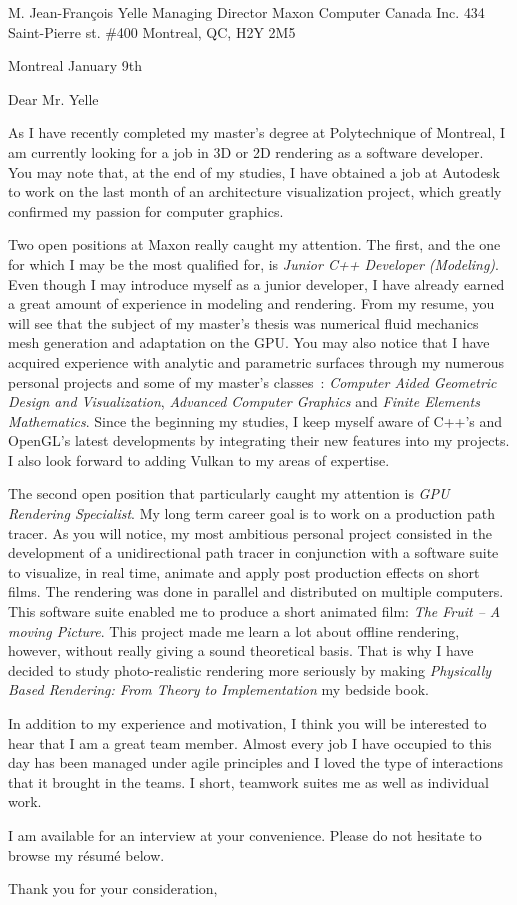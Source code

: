 \insertcvheader

\clrecipient
 {M. Jean-François Yelle}
 {Managing Director}
 {Maxon Computer Canada Inc.}
 {434 Saint-Pierre st. \#400}
 {Montreal, QC, H2Y 2M5}
 
\cllocationdate
 {Montreal}
 {January 9th}
 
\clgreeting
 {Dear Mr. Yelle}
 
As I have recently completed my master's degree at Polytechnique of Montreal, I am currently looking for a job in 3D or 2D rendering as a software developer. You may note that, at the end of my studies, I have obtained a job at Autodesk to work on the last month of an architecture visualization project, which greatly confirmed my passion for computer graphics.

Two open positions at Maxon really caught my attention. The first, and the one for which I may be the most qualified for, is \textit{Junior C++ Developer (Modeling)}. Even though I may introduce myself as a junior developer, I have already earned a great amount of experience in modeling and rendering. From my resume, you will see that the subject of my master's thesis was numerical fluid mechanics mesh generation and adaptation on the GPU. You may also notice that I have acquired experience with analytic and parametric surfaces through my numerous personal projects and some of my master's classes~: \textit{Computer Aided Geometric Design and Visualization}, \textit{Advanced Computer Graphics} and \textit{Finite Elements Mathematics}. Since the beginning my studies, I keep myself aware of C++'s and OpenGL's latest developments by integrating their new features into my projects. I also look forward to adding Vulkan to my areas of expertise. 

The second open position that particularly caught my attention is \textit{GPU Rendering Specialist}. My long term career goal is to work on a production path tracer. As you will notice, my most ambitious personal project consisted in the development of a unidirectional path tracer in conjunction with a software suite to visualize, in real time, animate and apply post production effects on short films. The rendering was done in parallel and distributed on multiple computers. This software suite enabled me to produce a short animated film: \textit{The Fruit -- A moving Picture}. This project made me learn a lot about offline rendering, however, without really giving a sound theoretical basis. That is why I have decided to study photo-realistic rendering more seriously by making \textit{Physically Based Rendering: From Theory to Implementation} my bedside book.
 
In addition to my experience and motivation, I think you will be interested to hear that I am a great team member. Almost every job I have occupied to this day has been managed under agile principles and I loved the type of interactions that it brought in the teams. I short, teamwork suites me as well as individual work.

I am available for an interview at your convenience. Please do not hesitate to browse my résumé below.

Thank you for your consideration,

